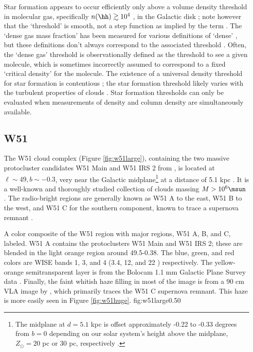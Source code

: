 Star formation appears to occur efficiently only above a volume
density threshold in molecular gas, specifically $n(\hh)\gtrsim10^4$ \percc,
in the Galactic disk
\citep[][who advocate a
column density threshold corresponding to this density]{Lada2010a}; note
however that the `threshold' is smooth, not  a step function as implied by the
term \citep{Padoan2013a}.
The `dense
gas mass fraction' has been measured for various definitions of `dense'
\citep{Battisti2014a,Wu2005a}, but these definitions don't always correspond to
the associated threshold
\citep{Kauffmann2010a,Parmentier2011a,Parmentier2011b}.  
Often, the `dense gas' threshold is observationally defined as the threshold
to see a given molecule, which is sometimes incorrectly assumed to correspond
to a fixed `critical density' for the molecule.
The existence of a universal 
density threshold for star formation is contentious
\citep{Burkert2012a,Clark2013b}; the star formation threshold likely
varies with the turbulent properties of clouds
\citep{Longmore2013b,Kruijssen2014c,Hennebelle2011a,Hennebelle2013a,Padoan2011b,Krumholz2005a}.
Star formation thresholds can only be evaluated when measurements of density
and column density are simultaneously available.  

\subsection{W51}
The W51 cloud complex (Figure \ref{fig:w51large}), containing the two 
massive protocluster candidates W51 Main and W51 IRS 2 from
\citet{Ginsburg2012a}, is located at
$\ell\sim49, b\sim-0.3$, very near the Galactic midplane\footnote{The midplane
at $d=5.1$ kpc is offset approximately -0.22 to -0.33 degrees from $b=0$
depending on our solar system's height above the midplane, $Z_\odot = 20$ pc or
30 pc, respectively \citep{Reed2006a,Joshi2007a}.} at a distance of 5.1 kpc
\citep{Sato2010a}.  It is a well-known and thoroughly studied collection of
clouds massing $M>10^6 \msun$
\citep{Carpenter1998a,Bieging2010a,Kang2010a,Parsons2012a}.  The radio-bright
regions are generally known as W51 A to the east, W51 B to the west, and W51 C
for the southern component, known to trace a supernova remnant
\citep{Koo1995a,Brogan2000a,Brogan2013a}.

{A color composite of the W51 region with major regions, W51 A, B, and C,
labeled.  W51 A contains the protoclusters W51 Main and W51 IRS 2; these
are blended in the light orange region around 49.5-0.38.  The
blue, green, and red colors are WISE bands 1, 3, and 4 (3.4, 12,
and 22 \um) respectively.  The yellow-orange semitransparent layer is from the
Bolocam 1.1 mm Galactic Plane Survey data \citep{Aguirre2011a,Ginsburg2013a}.
Finally, the faint whitish haze filling in most of the image is from a 90 cm
VLA image by \citet{Brogan2013a}, which primarily traces the W51 C supernova
remnant.  This haze is more easily seen in Figure \ref{fig:w51huge}.}
{fig:w51large}{0.5}{0}


